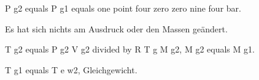 P g2 equals P g1 equals one point four zero zero nine four bar.

Es hat sich nichts am Ausdruck oder den Massen geändert.

T g2 equals P g2 V g2 divided by R T g M g2, M g2 equals M g1.

T g1 equals T e w2, Gleichgewicht.
